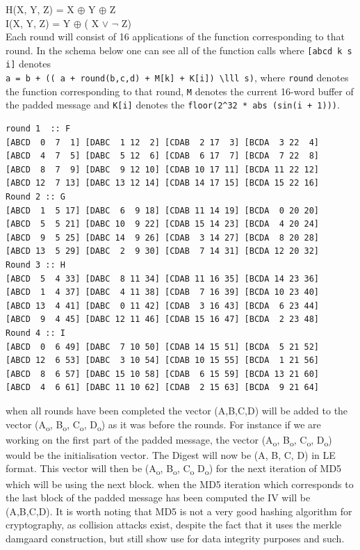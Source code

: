 \documentclass[a4paper]{article}
\begin{document}
H(X, Y, Z) = X \(\oplus\) Y \(\oplus\) Z\\
I(X, Y, Z) = Y \(\oplus\) ( X \(\vee\) \(\neg{}\) Z)\\
Each round will consist of 16 applications of the function corresponding to that round. In the schema below one can see all of the function calls where \texttt{[abcd k s i]} denotes\\
\texttt{a = b + (( a + round(b,c,d) + M[k] + K[i]) \textbackslash{}lll s)}, where \texttt{round} denotes the function corresponding to that round, \texttt{M} denotes the current 16-word buffer of the padded message and \texttt{K[i]} denotes the \texttt{floor(2\textasciicircum{}32 * abs (sin(i + 1)))}.
\begin{verbatim}
round 1  :: F
[ABCD  0  7  1] [DABC  1 12  2] [CDAB  2 17  3] [BCDA  3 22  4]
[ABCD  4  7  5] [DABC  5 12  6] [CDAB  6 17  7] [BCDA  7 22  8]
[ABCD  8  7  9] [DABC  9 12 10] [CDAB 10 17 11] [BCDA 11 22 12]
[ABCD 12  7 13] [DABC 13 12 14] [CDAB 14 17 15] [BCDA 15 22 16]
Round 2 :: G
[ABCD  1  5 17] [DABC  6  9 18] [CDAB 11 14 19] [BCDA  0 20 20]
[ABCD  5  5 21] [DABC 10  9 22] [CDAB 15 14 23] [BCDA  4 20 24]
[ABCD  9  5 25] [DABC 14  9 26] [CDAB  3 14 27] [BCDA  8 20 28]
[ABCD 13  5 29] [DABC  2  9 30] [CDAB  7 14 31] [BCDA 12 20 32]
Round 3 :: H
[ABCD  5  4 33] [DABC  8 11 34] [CDAB 11 16 35] [BCDA 14 23 36]
[ABCD  1  4 37] [DABC  4 11 38] [CDAB  7 16 39] [BCDA 10 23 40]
[ABCD 13  4 41] [DABC  0 11 42] [CDAB  3 16 43] [BCDA  6 23 44]
[ABCD  9  4 45] [DABC 12 11 46] [CDAB 15 16 47] [BCDA  2 23 48]
Round 4 :: I
[ABCD  0  6 49] [DABC  7 10 50] [CDAB 14 15 51] [BCDA  5 21 52]
[ABCD 12  6 53] [DABC  3 10 54] [CDAB 10 15 55] [BCDA  1 21 56]
[ABCD  8  6 57] [DABC 15 10 58] [CDAB  6 15 59] [BCDA 13 21 60]
[ABCD  4  6 61] [DABC 11 10 62] [CDAB  2 15 63] [BCDA  9 21 64]
\end{verbatim}
when all rounds have been completed the vector (A,B,C,D) will be added to the vector (A\textsubscript{o}, B\textsubscript{o}, C\textsubscript{o}, D\textsubscript{o}) as it was before the rounds. For instance if we are working on the first part of the padded message, the vector (A\textsubscript{o}, B\textsubscript{o}, C\textsubscript{o}, D\textsubscript{o}) would be the initialisation vector. The Digest will now be (A, B, C, D) in LE format. This vector will then be (A\textsubscript{o}, B\textsubscript{o}, C\textsubscript{o} D\textsubscript{o}) for the next iteration of MD5 which will be using the next block. when the MD5 iteration which corresponds to the last block of the padded message has been computed the IV will be (A,B,C,D).
It is worth noting that MD5 is not a very good hashing algorithm for cryptography, as collision attacks exist, despite the fact that it uses the merkle damgaard construction, but still show use for data integrity purposes and such.
\end{document}
